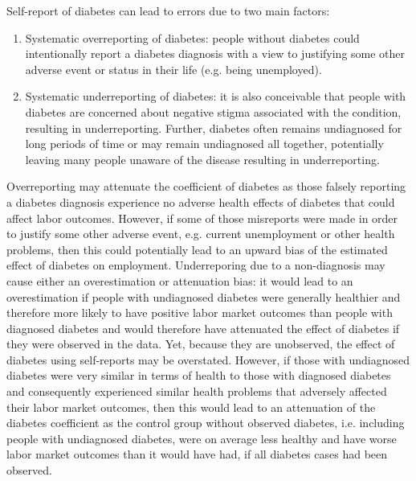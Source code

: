 \documentclass[12pt,english,british]{article}
\begin{document}
Self-report of diabetes can lead to errors due to two main factors: 
\begin{enumerate}
\item Systematic overreporting of diabetes: people without diabetes
could intentionally report a diabetes diagnosis with a view to justifying
some other adverse event or status in their life (e.g. being unemployed). 
\item Systematic underreporting of diabetes: it is also conceivable
that people with diabetes are concerned about negative stigma associated with the condition, resulting in underreporting. Further, diabetes often remains
undiagnosed for long periods of time or may remain undiagnosed all together, potentially
leaving many people unaware of the disease resulting in
underreporting.

\end{enumerate} 

Overreporting may attenuate the coefficient of diabetes as those falsely reporting a diabetes diagnosis experience no adverse health
effects of diabetes that could affect labor outcomes. However, if some of those misreports were
made in order to justify some other adverse event, e.g. current unemployment
or other health problems, then this could potentially lead to an upward bias
of the estimated effect of diabetes on employment. Underreporing due to
a non-diagnosis may cause either an overestimation or attenuation
bias: it would lead to an overestimation if people with undiagnosed
diabetes were generally healthier and therefore more likely to have
positive labor market outcomes than people with diagnosed diabetes
and would therefore have attenuated the effect of diabetes if they
were observed in the data. Yet, because they are unobserved, the effect
of diabetes using self-reports may be overstated. However, if those
with undiagnosed diabetes were very similar in terms of health to those with
diagnosed diabetes and consequently experienced similar health problems
that adversely affected their labor market outcomes, then this would lead to an attenuation of the diabetes coefficient as the control group without observed diabetes, i.e. including people with undiagnosed
diabetes, were on average less healthy and have worse labor market outcomes than it
would have had, if all diabetes cases had been observed.
\end{document}
